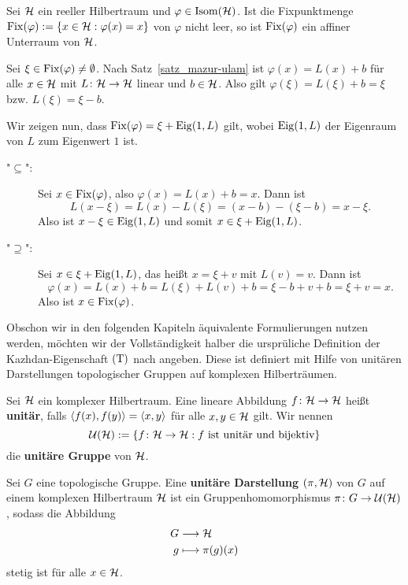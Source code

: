 \begin{korollar}
\label{kor:fix_affin}
	Sei $\mathcal{H}$ ein reeller Hilbertraum und $\varphi \in \operatorname{Isom}(\mathcal{H})$. Ist die Fixpunktmenge $\operatorname{Fix}(\varphi) := \{x \in \mathcal{H} : \varphi(x) = x\}$ von $\varphi$ nicht leer, so ist $\operatorname{Fix}(\varphi)$ ein affiner Unterraum von $\mathcal{H}$.
\end{korollar}

\begin{beweis}
	Sei $\xi \in \operatorname{Fix}(\varphi) \neq \emptyset$. Nach Satz~\ref{satz_mazur-ulam} ist $\varphi(x) = L(x) + b$ für alle $x \in \mathcal{H}$ mit $L\colon \mathcal{H} \rightarrow \mathcal{H}$ linear und $b \in \mathcal{H}$. Also gilt $\varphi(\xi) = L(\xi) + b = \xi$ bzw. $L(\xi) = \xi - b$.
	
	Wir zeigen nun, dass $\operatorname{Fix}(\varphi) = \xi + \operatorname{Eig}(1,L)$ gilt, wobei $\operatorname{Eig}(1,L)$ der Eigenraum von $L$ zum Eigenwert $1$ ist.	
	\begin{description}
		\item["$\subseteq$":] Sei $x \in \operatorname{Fix}(\varphi)$, also $\varphi(x) = L(x) + b = x$. Dann ist
		\[
		L(x-\xi) = L(x) - L(\xi) = (x-b) - (\xi - b) = x - \xi.
		\]
		Also ist $x - \xi \in \operatorname{Eig}(1,L)$ und somit $x \in \xi + \operatorname{Eig}(1,L)$.
		\item["$\supseteq$":] Sei $x \in \xi + \operatorname{Eig}(1,L)$, das heißt $x = \xi + v$ mit $L(v) = v$. Dann ist
		\[
		\varphi(x) = L(x) + b = L(\xi) + L(v) + b = \xi - b + v + b = \xi + v = x.
		\]
		Also ist $x \in \operatorname{Fix}(\varphi)$. \qedhere
	\end{description} 
\end{beweis}

Obschon wir in den folgenden Kapiteln äquivalente Formulierungen nutzen werden, möchten wir der Vollständigkeit halber die ursprüliche Definition der Kazhdan-Eigenschaft $\operatorname{(T)}$ nach \cite[Def. 1.1.3]{BekkaHarpeValette} angeben. Diese ist definiert mit Hilfe von unitären Darstellungen topologischer Gruppen auf komplexen Hilberträumen.

\begin{definition}
	Sei $\mathcal{H}$ ein komplexer Hilbertraum. Eine lineare Abbildung $f\colon \mathcal{H} \rightarrow \mathcal{H}$ heißt \textbf{unitär}, falls $\langle f(x),f(y)\rangle = \langle x,y\rangle$ für alle $x,y \in \mathcal{H}$ gilt. Wir nennen
	\[
		\mathcal{U}(\mathcal{H}) := \{f \colon \mathcal{H} \rightarrow \mathcal{H} : f \text{ ist unitär und bijektiv}\}
	\]
	die \textbf{unitäre Gruppe} von $\mathcal{H}$.
\end{definition}

\begin{definition}
	Sei $G$ eine topologische Gruppe. Eine \textbf{unitäre Darstellung} $(\pi,\mathcal{H})$ von $G$ auf einem komplexen Hilbertraum $\mathcal{H}$ ist ein Gruppenhomomorphismus $\pi \colon G \rightarrow \mathcal{U}(\mathcal{H})$, sodass die Abbildung
	\begin{equation}
	\begin{aligned}
		G &\longrightarrow \mathcal{H} \\
		g &\longmapsto \pi(g)(x)
	\end{aligned}
	\end{equation}
	stetig ist für alle $x \in \mathcal{H}$.
\end{definition}


